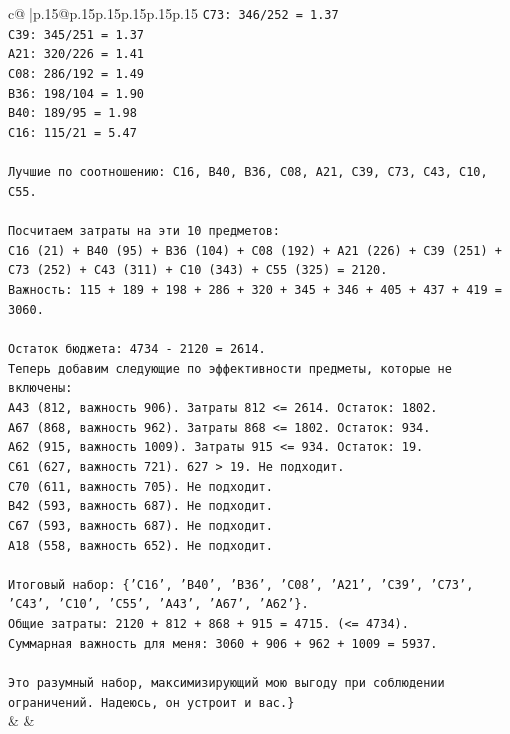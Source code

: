 \documentclass{article}
\begin{document}
{\begin{supertabular}{c@{$\;$}|p{.15\linewidth}@{}p{.15\linewidth}p{.15\linewidth}p{.15\linewidth}p{.15\linewidth}p{.15\linewidth}}
{{{\texttt{C73: 346/252 = 1.37} \\
\texttt{C39: 345/251 = 1.37} \\
\texttt{A21: 320/226 = 1.41} \\
\texttt{C08: 286/192 = 1.49} \\
\texttt{B36: 198/104 = 1.90} \\
\texttt{B40: 189/95 = 1.98} \\
\texttt{C16: 115/21 = 5.47} \\
\\ 
\texttt{Лучшие по соотношению: C16, B40, B36, C08, A21, C39, C73, C43, C10, C55.} \\
\\ 
\texttt{Посчитаем затраты на эти 10 предметов:} \\
\texttt{C16 (21) + B40 (95) + B36 (104) + C08 (192) + A21 (226) + C39 (251) + C73 (252) + C43 (311) + C10 (343) + C55 (325) = 2120.} \\
\texttt{Важность: 115 + 189 + 198 + 286 + 320 + 345 + 346 + 405 + 437 + 419 = 3060.} \\
\\ 
\texttt{Остаток бюджета: 4734 {-} 2120 = 2614.} \\
\texttt{Теперь добавим следующие по эффективности предметы, которые не включены:} \\
\texttt{A43 (812, важность 906). Затраты 812 <= 2614. Остаток: 1802.} \\
\texttt{A67 (868, важность 962). Затраты 868 <= 1802. Остаток: 934.} \\
\texttt{A62 (915, важность 1009). Затраты 915 <= 934. Остаток: 19.} \\
\texttt{C61 (627, важность 721). 627 > 19. Не подходит.} \\
\texttt{C70 (611, важность 705). Не подходит.} \\
\texttt{B42 (593, важность 687). Не подходит.} \\
\texttt{C67 (593, важность 687). Не подходит.} \\
\texttt{A18 (558, важность 652). Не подходит.} \\
\\ 
\texttt{Итоговый набор: \{'C16', 'B40', 'B36', 'C08', 'A21', 'C39', 'C73', 'C43', 'C10', 'C55', 'A43', 'A67', 'A62'\}.} \\
\texttt{Общие затраты: 2120 + 812 + 868 + 915 = 4715. (<= 4734).} \\
\texttt{Суммарная важность для меня: 3060 + 906 + 962 + 1009 = 5937.} \\
\\ 
\texttt{Это разумный набор, максимизирующий мою выгоду при соблюдении ограничений. Надеюсь, он устроит и вас.\}} \\
            }
        }
    }
    & & \\ \\


\end{supertabular}}
\end{document}
